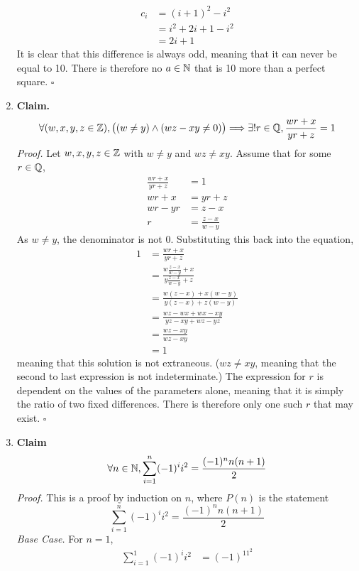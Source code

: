 \documentclass[../MATH135.tex]{subfiles}
\begin{document}
\begin{enumerate}
						\begin{align*}
							c_i &= (i + 1)^2 - i^2 \\
								&= i^2 + 2i + 1 - i^2 \\
								&= 2i + 1
						\end{align*}
						It is clear that this difference is always odd, meaning that it can never be equal to 10. There is therefore no \(a \in \mathbb{N}\) that is 10 more than a perfect square. \(\square\)
			\item
				\textbf{Claim.} \[\forall (w, x, y, z \in \mathbb{Z}), \bigl((w \ne y) \land (wz - xy \ne 0)\bigr) \Longrightarrow \exists!r \in \mathbb{Q}, \dfrac{wr + x}{yr + z} = 1\]
				\textit{Proof.}
					Let \(w, x, y, z \in \mathbb{Z}\) with \(w \ne y\) and \(wz \ne xy\). Assume that for some \(r \in \mathbb{Q}\),
					\begin{align*}
						\frac{wr + x}{yr + z} &= 1 \\
						wr + x &= yr + z \\
						wr - yr &= z - x \\
						r &= \frac{z - x}{w - y}
					\end{align*}
					As \(w \ne y\), the denominator is not 0. Substituting this back into the equation,
					\begin{align*}
						1 &= \frac{wr + x}{yr + z} \\
							&= \frac{w\frac{z - x}{w - y} + x}{y\frac{z - x}{w - y} + z} \\
							&= 	\frac{w(z - x) + x(w - y)}{y(z - x) + z(w - y)} \\
							&= \frac{wz - wx + wx - xy}{yz - xy + wz - yz} \\
							&= \frac{wz - xy}{wz - xy} \\
							&= 1
					\end{align*}
					meaning that this solution is not extraneous. (\(wz \ne xy\), meaning that the second to last expression is not indeterminate.) The expression for \(r\) is dependent on the values of the parameters alone, meaning that it is simply the ratio of two fixed differences. There is therefore only one such \(r\) that may exist. \(\square\)
			\item
				\textbf{Claim}
					\[\forall n \in \mathbb{N}, \sum_{i = 1}^n (-1)^ii^2 = \frac{(-1)^nn(n + 1)}{2}\]
				\textit{Proof.}
					This is a proof by induction on \(n\), where \(P(n)\) is the statement
						\[\sum_{i = 1}^n (-1)^ii^2 = \frac{(-1)^nn(n + 1)}{2}\]
					\textit{Base Case.}
						For \(n = 1\),
							\begin{align*}
								\sum_{i = 1}^1 (-1)^ii^2 &= (-1)^11^2 \\

\end{align*}
\end{enumerate}
\end{document}
